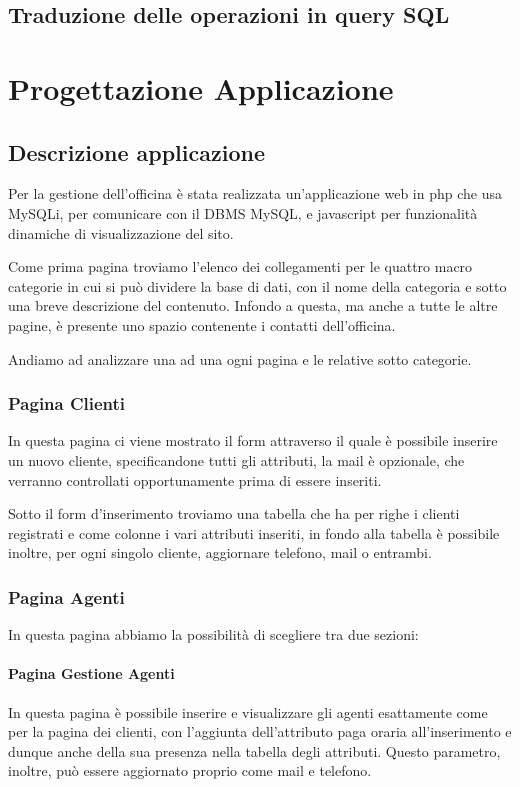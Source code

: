 \documentclass[a4paper,12pt]{report}
\begin{document}
\section{Traduzione delle operazioni in query SQL}

\chapter{Progettazione Applicazione}

\section{Descrizione applicazione}
Per la gestione dell'officina è stata realizzata un'applicazione web in php che usa MySQLi, per  
%
comunicare con il DBMS MySQL, e javascript per funzionalità dinamiche di visualizzazione del sito.

Come prima pagina troviamo l'elenco dei collegamenti per le quattro macro categorie in cui si può dividere la base 
%
di dati, con il nome della categoria e sotto una breve descrizione del contenuto. 
%
Infondo a questa, ma anche a tutte le altre pagine, è presente uno spazio contenente i contatti dell'officina.

Andiamo ad analizzare una ad una ogni pagina e le relative sotto categorie.

\subsection*{Pagina Clienti}
In questa pagina ci viene mostrato il form attraverso il quale è possibile inserire un nuovo cliente, specificandone
%
tutti gli attributi, la mail è opzionale, che verranno controllati opportunamente prima di essere inseriti.

Sotto il form d'inserimento troviamo una tabella che ha per righe i clienti registrati e come colonne i vari attributi	
%
inseriti, in fondo alla tabella è possibile inoltre, per ogni singolo cliente, aggiornare telefono, mail o entrambi.

\subsection*{Pagina Agenti}
In questa pagina abbiamo la possibilità di scegliere tra due sezioni:

\subsubsection*{Pagina Gestione Agenti}
In questa pagina è possibile inserire e visualizzare gli agenti esattamente come per la pagina dei clienti, con 
%
l'aggiunta dell'attributo paga oraria all'inserimento e dunque anche della sua presenza nella tabella degli attributi.
%
Questo parametro, inoltre, può essere aggiornato proprio come mail e telefono.
\end{document}
